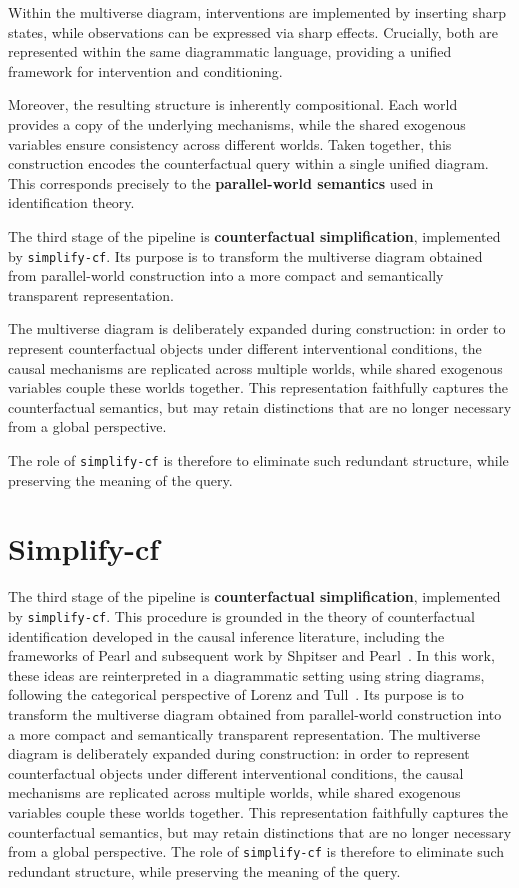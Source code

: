 \documentclass[a4paper]{report}
\begin{document}
Within the multiverse diagram, interventions are implemented by inserting sharp states, while observations can be expressed via sharp effects. Crucially, both are represented within the same diagrammatic language, providing a unified framework for intervention and conditioning.


Moreover, the resulting structure is inherently compositional. Each world provides a copy of the underlying mechanisms, while the shared exogenous variables ensure consistency across different worlds. Taken together, this construction encodes the counterfactual query within a single unified diagram. This corresponds precisely to the \textbf{parallel-world semantics} used in identification theory.

The third stage of the pipeline is \textbf{counterfactual simplification}, implemented by \texttt{simplify-cf}. Its purpose is to transform the multiverse diagram obtained from parallel-world construction into a more compact and semantically transparent representation.

The multiverse diagram is deliberately expanded during construction: in order to represent counterfactual objects under different interventional conditions, the causal mechanisms are replicated across multiple worlds, while shared exogenous variables couple these worlds together. This representation faithfully captures the counterfactual semantics, but may retain distinctions that are no longer necessary from a global perspective.

The role of \texttt{simplify-cf} is therefore to eliminate such redundant structure, while preserving the meaning of the query.

\section{Simplify-cf}
The third stage of the pipeline is \textbf{counterfactual simplification}, implemented by \texttt{simplify-cf}. This procedure is grounded in the theory of counterfactual identification developed in the causal inference literature, including the frameworks of Pearl and subsequent work by Shpitser and Pearl~\cite{pearl2009causality, shpitser2006identification}. In this work, these ideas are reinterpreted in a diagrammatic setting using string diagrams, following the categorical perspective of Lorenz and Tull~\cite{lorenz2023causal}. Its purpose is to transform the multiverse diagram obtained from parallel-world construction into a more compact and semantically transparent representation. The multiverse diagram is deliberately expanded during construction: in order to represent counterfactual objects under different interventional conditions, the causal mechanisms are replicated across multiple worlds, while shared exogenous variables couple these worlds together. This representation faithfully captures the counterfactual semantics, but may retain distinctions that are no longer necessary from a global perspective. The role of \texttt{simplify-cf} is therefore to eliminate such redundant structure, while preserving the meaning of the query.
\end{document}
